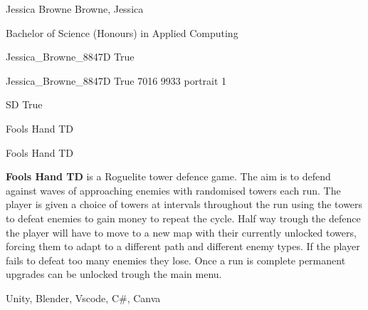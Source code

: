 \documentclass[twoside]{report}
\begin{document}
\begingroup{}\relax



\def\Key{Jessica_Browne_8847D}

{Jessica Browne}
{Browne, Jessica}

{Bachelor of Science (Honours) in Applied Computing}

{Jessica_Browne_8847D}
{True}

{Jessica_Browne_8847D}
{True}
{7016}
{9933}
{portrait}
{1}

{SD}
{True}

{Fools Hand TD}

{Fools Hand TD}

{{\bfseries Fools Hand TD} is a Roguelite tower defence game. The aim is to defend against waves of approaching enemies with randomised towers each run. The player is given a choice of towers at intervals throughout the run using the towers to defeat enemies to gain money to repeat the cycle.  Half way trough the defence the player will have to move to a new map with their currently unlocked towers, forcing them to adapt to a different path and different enemy types. If the player fails to defeat too many enemies they lose. Once a run is complete permanent upgrades can be unlocked trough the main menu.}

{Unity, Blender, Vscode, C\#, Canva}
\end{document}
